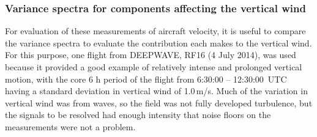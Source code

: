 \documentclass[12pt,twoside,english]{article}\usepackage[]{graphicx}\usepackage[]{color}
\let\OrgIndex\index
\renewcommand*{\index}[1]{\OrgIndex{#1}}
\begin{document}
\subsubsection{Variance spectra for components affecting the vertical wind\label{sub:Variance-spectra-for-W-components}}

For evaluation of these measurements of aircraft velocity, it is useful to compare the variance spectra to evaluate the contribution each makes to the vertical wind. For this purpose, one flight from DEEPWAVE, RF16 (4 July 2014), was used because it provided a good example of relatively intense and prolonged vertical motion, with the core 6 h period of the flight from 6:30:00 -- 12:30:00~UTC having a standard deviation in vertical wind of 1.0\,m/s. Much of the variation in vertical wind was from waves, so the field was not fully developed turbulence, but the signals to be resolved had enough intensity that noise floors on the measurements were not a problem. 
\end{document}
